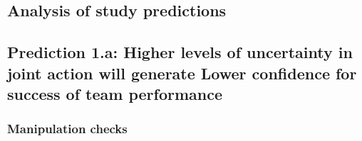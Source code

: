 \begin{CJK}{UTF8}{gbsn}



















\section{Analysis of study predictions\label{sect:resultsStudyPredictions}}


\subsection{Prediction 1.a: Higher levels of uncertainty in joint action will generate Lower confidence for success of team performance}

\subsubsection{Manipulation checks}


\end{CJK}
